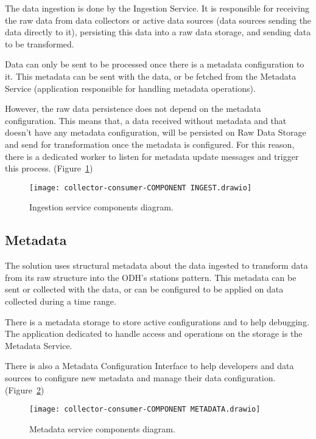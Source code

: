 The data ingestion is done by the Ingestion Service. It is responsible for receiving the raw data from data collectors or active data sources (data sources sending the data directly to it), persisting this data into a raw data storage, and sending data to be transformed.

Data can only be sent to be processed once there is a metadata configuration to it. This metadata can be sent with the data, or be fetched from the Metadata Service (application responsible for handling metadata operations).

However, the raw data persistence does not depend on the metadata configuration. This means that, a data received without metadata and that doesn't have any metadata configuration, will be persisted on Raw Data Storage and send for transformation once the metadata is configured. For this reason, there is a dedicated worker to listen for metadata update messages and trigger this process. (Figure~\ref{fig:ingest})

\begin{figure}
    \centering
    \texttt{[image: collector-consumer-COMPONENT INGEST.drawio]}
    \caption{Ingestion service components diagram.\label{fig:ingest}}
\end{figure}

\subsection{Metadata}
\label{sec:ingestion}

The solution uses structural metadata about the data ingested to transform data from its raw structure into the ODH's stations pattern. This metadata can be sent or collected with the data, or can be configured to be applied on data collected during a time range.

There is a metadata storage to store active configurations and to help debugging. The application dedicated to handle access and operations on the storage is the Metadata Service.

There is also a Metadata Configuration Interface to help developers and data sources to configure new metadata and manage their data configuration. (Figure~\ref{fig:metadata})

\begin{figure}
    \centering
    \texttt{[image: collector-consumer-COMPONENT METADATA.drawio]}
    \caption{Metadata service components diagram.\label{fig:metadata}}
\end{figure}

